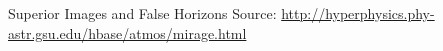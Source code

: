 \documentclass[linespread=1.4]{ctexbeamer}
\begin{document}
\begin{frame}
\begin{block}{Superior Images and False Horizons \citep{Mirage-Greenler1980,AtmRefrac-Hyperphysics}}
Source: \url{http://hyperphysics.phy-astr.gsu.edu/hbase/atmos/mirage.html}
\end{block}

\vfill

\begin{block}{\refname}
\renewcommand*{\bibfont}{\small\linespread{1}\selectfont}
\setlength{\biblabelsep}{0.25em}
\addtolength{\bibitemsep}{-0.5ex}
\printbibliography[heading=none]
\end{block}

\end{frame}
\end{document}
